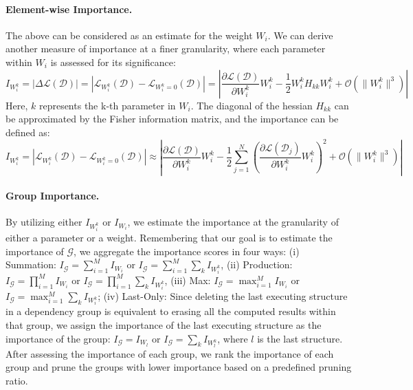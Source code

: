 \paragraph{Element-wise Importance.} The above can be considered as an estimate for the weight $W_i$. We can derive another measure of importance at a finer granularity, where each parameter within $W_i$ is assessed for its significance:
\begin{equation}
    I_{W_i^k} = | \Delta \mathcal{L}(\mathcal{D})| = |\mathcal{L}_{W_i^k}(\mathcal{D}) - \mathcal{L}_{W_i^k=0}(\mathcal{D})| = | \frac{\partial \mathcal{L}(\mathcal{D})}{\partial W_i^k} W_i^k-\frac{1}{2} {W_i^k} H_{kk} W_i^k + \mathcal{O}\left(\| W_i^k \|^3\right) |
\label{eq:element_taylor}
\end{equation} 
Here, $k$ represents the k-th parameter in $W_i$. The diagonal of the hessian $H_{kk}$ can be approximated by the Fisher information matrix, and the importance can be defined as:
\begin{equation}
    I_{W_i^k} = | \mathcal{L}_{W_i^k}(\mathcal{D}) - \mathcal{L}_{W_i^k=0}(\mathcal{D})| \approx | \frac{\partial \mathcal{L}(\mathcal{D})}{\partial W_i^k} W_i^k-\frac{1}{2} \sum_{j=1}^N \left(\frac{\partial \mathcal{L}(\mathcal{D}_j)}{\partial W_i^k} W_i^k\right)^2 + \mathcal{O}\left(\| W_i^k \|^3\right) | \label{eq:element_final_taylor}
\end{equation} 
\paragraph{Group Importance.} By utilizing either $I_{W_i^k}$ or $I_{W_i}$, we estimate the importance at the granularity of either a parameter or a weight. Remembering that our goal is to estimate the importance of $\mathcal{G}$, we aggregate the importance scores in four ways:
(i) Summation: $I_{\mathcal{G}} = \sum_{i=1}^{M}I_{W_i}$ or $I_{\mathcal{G}} = \sum_{i=1}^{M}\sum_k I_{W_i^k}$, (ii) Production: $I_{\mathcal{G}} = \prod_{i=1}^{M}I_{W_i}$ or $I_{\mathcal{G}} = \prod_{i=1}^{M}\sum_k I_{W_i^k}$, (iii) Max: $I_{\mathcal{G}} = \max_{i=1}^{M}I_{W_i}$ or $I_{\mathcal{G}} = \max_{i=1}^{M}\sum_k I_{W_i^k}$; (iv) Last-Only: Since deleting the last executing structure in a dependency group is equivalent to erasing all the computed results within that group, we assign the importance of the last executing structure as the importance of the group: $I_{\mathcal{G}} = I_{W_l}$ or $I_{\mathcal{G}} = \sum_k I_{W_l^k}$, where $l$ is the last structure. After assessing the importance of each group, we rank the importance of each group and prune the groups with lower importance based on a predefined pruning ratio.


